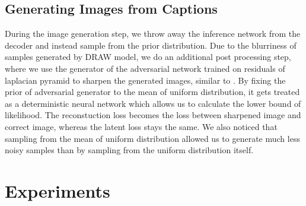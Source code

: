 \documentclass{article} %
\begin{document}
\subsection{Generating Images from Captions}

During the image generation step, we throw away the inference network from the decoder and instead sample from the prior distribution. Due to the blurriness of samples generated by DRAW model, we do an additional post processing step, where we use the generator of the adversarial network trained on residuals of laplacian pyramid to sharpen the generated images, similar to \citep{denton_lapgan}. By fixing the prior of adversarial generator to the mean of uniform distribution, it gets treated as a deterministic neural network which allows us to calculate the lower bound of likelihood. The reconstuction loss becomes the loss between sharpened image and correct image, whereas the latent loss stays the same. We also noticed that sampling from the mean of uniform distribution allowed us to generate much less noisy samples than by sampling from the uniform distribution itself.  

\section{Experiments}
\end{document}
